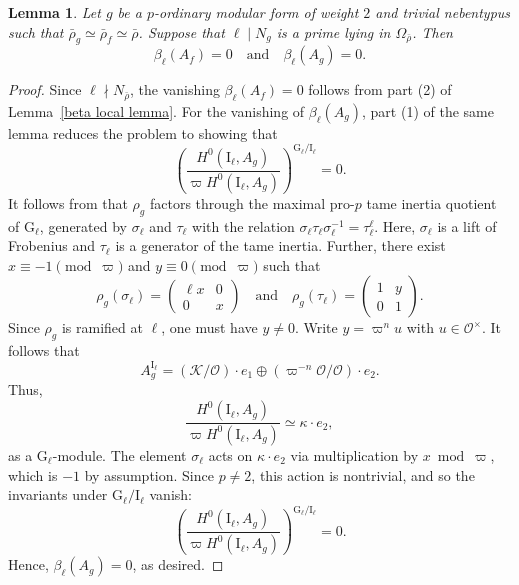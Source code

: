 \documentclass[table]{amsart}
\newtheorem{lemma}[theorem]{Lemma}
\numberwithin{equation}{section}
\begin{document}
\begin{lemma}\label{vanishing invariants for primes in Omega_f}
Let $g$ be a $p$-ordinary modular form of weight $2$ and trivial nebentypus such that $\bar{\rho}_g \simeq \bar{\rho}_f\simeq \bar{\rho}$. Suppose that $\ell \mid N_g$ is a prime lying in $\Omega_{\bar{\rho}}$. Then
\[
\beta_\ell(A_f) = 0 \quad \text{and} \quad \beta_\ell(A_g) = 0.
\]
\end{lemma}

\begin{proof}
Since $\ell\nmid N_{\bar{\rho}}$, the vanishing $\beta_\ell(A_f) = 0$ follows from part (2) of Lemma~\ref{beta local lemma}. For the vanishing of $\beta_\ell(A_g)$, part (1) of the same lemma reduces the problem to showing that
\[
\left( \frac{H^0(\mathrm{I}_\ell, A_g)}{\varpi H^0(\mathrm{I}_\ell, A_g)} \right)^{\mathrm{G}_\ell/\mathrm{I}_\ell} = 0.
\]
It follows from \cite[Lemma 4.4]{Rayblms} that $\rho_g$ factors through the maximal pro-$p$ tame inertia quotient of $\mathrm{G}_\ell$, generated by $\sigma_\ell$ and $\tau_\ell$ with the relation $\label{sigma tau reln}\sigma_\ell \tau_\ell \sigma_\ell^{-1} = \tau_\ell^\ell$. Here, $\sigma_\ell$ is a lift of Frobenius and $\tau_\ell$ is a generator of the tame inertia. Further, there exist $x \equiv -1 \pmod{\varpi}$ and $y \equiv 0 \pmod{\varpi}$ such that
\[
\rho_g(\sigma_\ell) = \begin{pmatrix} \ell x & 0 \\ 0 & x \end{pmatrix} \quad \text{and} \quad \rho_g(\tau_\ell) = \begin{pmatrix} 1 & y \\ 0 & 1 \end{pmatrix}.
\] Since $\rho_g$ is ramified at $\ell$, one must have $y \neq 0$. Write $y = \varpi^n u$ with $u \in \mathcal{O}^\times$. It follows that
\[
A_g^{\mathrm{I}_\ell} = \left( \mathcal{K}/\mathcal{O} \right) \cdot e_1 \oplus \left( \varpi^{-n} \mathcal{O}/\mathcal{O} \right) \cdot e_2.
\]
Thus,
\[
\frac{H^0(\mathrm{I}_\ell, A_g)}{\varpi H^0(\mathrm{I}_\ell, A_g)} \simeq \kappa \cdot e_2,
\]
as a $\mathrm{G}_\ell$-module. The element $\sigma_\ell$ acts on $\kappa \cdot e_2$ via multiplication by $x \bmod \varpi$, which is $-1$ by assumption. Since $p \neq 2$, this action is nontrivial, and so the invariants under $\mathrm{G}_\ell/\mathrm{I}_\ell$ vanish:
\[
\left( \frac{H^0(\mathrm{I}_\ell, A_g)}{\varpi H^0(\mathrm{I}_\ell, A_g)} \right)^{\mathrm{G}_\ell/\mathrm{I}_\ell} = 0.
\]
Hence, $\beta_\ell(A_g) = 0$, as desired.
\end{proof}
\end{document}
